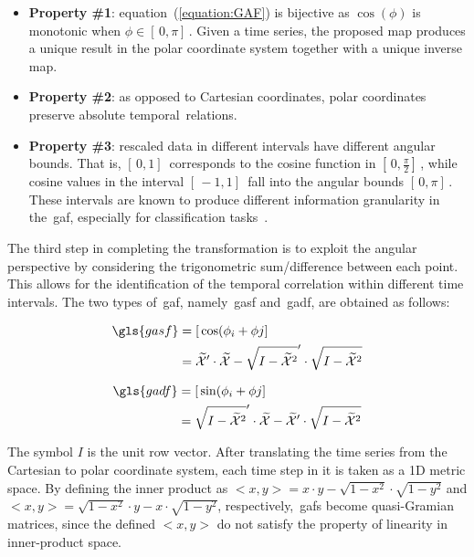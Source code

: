 \begin{itemize}[leftmargin=*,labelsep=5.8mm]
\item \textbf{{Property \#1}}: equation~(\ref{equation:GAF}) is bijective as $\cos(\phi)$ is monotonic when $\phi \in [\,0,\pi]\,$. Given a time series, the proposed map produces a unique result in the polar coordinate system together with a unique inverse map. 
\item \textbf{{Property \#2}}: as opposed to Cartesian coordinates, polar coordinates preserve absolute temporal~relations.
\item \textbf{{Property \#3}}: rescaled data in different intervals have different angular bounds. That is, $[\,0,1]\,$ corresponds to the cosine function in $[\,0,\frac{\pi}{2}]\,$, while cosine values in the interval $[\,-1,1]\,$ fall into the angular bounds $[\,0,\pi]\,$. These intervals are known to produce different information granularity in the~\gls{gaf}, especially for classification tasks~\citep{wang_imaging_2015}.
\end{itemize}

The third step in completing the transformation is to exploit the angular perspective by considering the trigonometric sum/difference between each point. This allows for the identification of the temporal correlation within different time intervals. The two types of~\gls{gaf}, namely~\gls{gasf} and~\gls{gadf}, are obtained as follows:

\begin{equation}
    \begin{aligned}
    \gls{gasf} &= [\,\cos(\phi_{i} + \phi{j}]\, \\
    	 &= \widetilde{\mathcal{X}}' \cdot \widetilde{\mathcal{X}} - \sqrt{I-\widetilde{\mathcal{X}}^2}' \cdot \sqrt{I-\widetilde{\mathcal{X}}^2}
    \end{aligned}
\end{equation}

\begin{equation}
    \begin{aligned}
    \gls{gadf} &= [\,\sin(\phi_{i} + \phi{j}]\, \\
    	 &= \sqrt{I-\widetilde{\mathcal{X}}^2}' \cdot \widetilde{\mathcal{X}} - \widetilde{\mathcal{X}}' \cdot \sqrt{I-\widetilde{\mathcal{X}}^2}\\
    \end{aligned}
\end{equation}

The symbol $I$ is the unit row vector. After translating the time series from the Cartesian to polar coordinate system, each time step in it is taken as a 1D metric space. By defining the inner product as $<x,y> = x \cdot y - \sqrt{1-x^2} \cdot \sqrt{1-y^2}$ and $<x,y> = \sqrt{1-x^2} \cdot y - x \cdot \sqrt{1-y^2}$, respectively,~\gls{gaf}s become {quasi-Gramian} matrices, since the defined $<x,y>$ do not satisfy the property of linearity in inner-product space.

